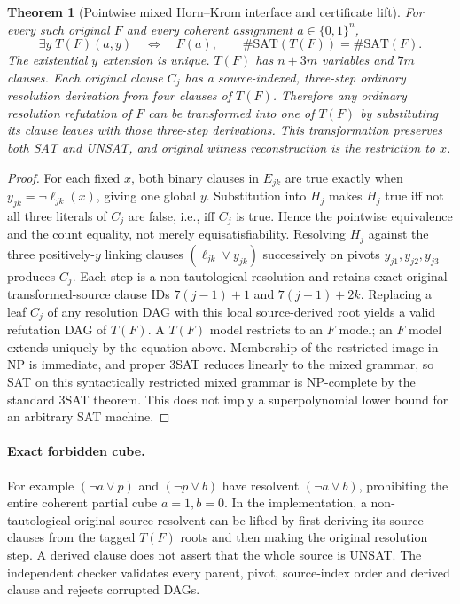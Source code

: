 \documentclass[11pt]{article}
\newtheorem{theorem}{Theorem}
\begin{document}
\begin{theorem}[Pointwise mixed Horn--Krom interface and certificate lift]
For every such original $F$ and every coherent assignment $a\in\{0,1\}^n$,
\[
 \exists y\;T(F)(a,y)\quad\Longleftrightarrow\quad F(a),
 \qquad \#\mathrm{SAT}(T(F))=\#\mathrm{SAT}(F).
\]
The existential $y$ extension is unique. $T(F)$ has $n+3m$ variables and $7m$ clauses. Each original clause $C_j$ has a source-indexed, three-step ordinary resolution derivation from four clauses of $T(F)$. Therefore any ordinary resolution refutation of $F$ can be transformed into one of $T(F)$ by substituting its clause leaves with those three-step derivations. This transformation preserves both SAT and UNSAT, and original witness reconstruction is the restriction to $x$.
\end{theorem}
\begin{proof}
For each fixed $x$, both binary clauses in $E_{jk}$ are true exactly when $y_{jk}=\neg\ell_{jk}(x)$, giving one global $y$. Substitution into $H_j$ makes $H_j$ true iff not all three literals of $C_j$ are false, i.e., iff $C_j$ is true. Hence the pointwise equivalence and the count equality, not merely equisatisfiability. Resolving $H_j$ against the three positively-$y$ linking clauses $(\ell_{jk}\vee y_{jk})$ successively on pivots $y_{j1},y_{j2},y_{j3}$ produces $C_j$. Each step is a non-tautological resolution and retains exact original transformed-source clause IDs $7(j-1)+1$ and $7(j-1)+2k$. Replacing a leaf $C_j$ of any resolution DAG with this local source-derived root yields a valid refutation DAG of $T(F)$. A $T(F)$ model restricts to an $F$ model; an $F$ model extends uniquely by the equation above. Membership of the restricted image in NP is immediate, and proper 3SAT reduces linearly to the mixed grammar, so SAT on this syntactically restricted mixed grammar is NP-complete by the standard 3SAT theorem. This does not imply a superpolynomial lower bound for an arbitrary SAT machine.\end{proof}

\paragraph{Exact forbidden cube.}
For example $(\neg a\vee p)$ and $(\neg p\vee b)$ have resolvent $(\neg a\vee b)$, prohibiting the entire coherent partial cube $a=1,b=0$. In the implementation, a non-tautological original-source resolvent can be lifted by first deriving its source clauses from the tagged $T(F)$ roots and then making the original resolution step. A derived clause does not assert that the whole source is UNSAT. The independent checker validates every parent, pivot, source-index order and derived clause and rejects corrupted DAGs.
\end{document}
